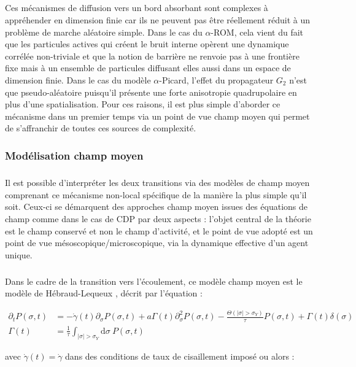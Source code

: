 \subparagraph{}Ces mécanismes de diffusion vers un bord absorbant sont complexes à appréhender en dimension finie car ils ne peuvent pas être réellement réduit à un problème de marche aléatoire simple. Dans le cas du $\alpha$-ROM, cela vient du fait que les particules actives qui créent le bruit interne opèrent une dynamique corrélée non-triviale et que la notion de barrière ne renvoie pas à une frontière fixe mais à un ensemble de particules diffusant elles aussi dans un espace de dimension finie. Dans le cas du modèle $\alpha$-Picard, l'effet du propagateur $G_2$ n'est que pseudo-aléatoire puisqu'il présente une forte anisotropie quadrupolaire en plus d'une spatialisation. Pour ces raisons, il est plus simple d'aborder ce mécanisme dans un premier temps via un point de vue champ moyen qui permet de s'affranchir de toutes ces sources de complexité. 

\subsubsection{Modélisation champ moyen}

\subparagraph{}Il est possible d’interpréter les deux transitions via des modèles de champ moyen comprenant ce mécanisme non-local spécifique de la manière la plus simple qu'il soit. Ceux-ci se démarquent des approches champ moyen issues des équations de champ comme dans le cas de CDP par deux aspects : l'objet central de la théorie est le champ conservé et non le champ d'activité, et le point de vue adopté est un point de vue mésoscopique/microscopique, via la dynamique effective d'un agent unique.

\subparagraph{}Dans le cadre de la transition vers l'écoulement, ce modèle champ moyen est le modèle de Hébraud-Lequeux \cite{hebraud_mode-coupling_1998}, décrit par l'équation :

\begin{equation}
\begin{aligned}
	\partial_t P(\sigma, t) &= -\dot{\gamma}(t)\partial_\sigma P(\sigma, t) + a\Gamma(t)\partial_\sigma^2P(\sigma, t) - \frac{\Theta (|\sigma|>\sigma_Y)}{\tau}P(\sigma, t) + \Gamma(t)\delta(\sigma)\\
	\Gamma(t) &= \frac{1}{\tau}\int_{|\sigma|>\sigma_Y}\mathrm{d}\sigma ~ P(\sigma, t)
\end{aligned}
\end{equation}

\noindent avec $\dot{\gamma}(t) = \dot{\gamma}$ dans des conditions de taux de cisaillement imposé ou alors :

